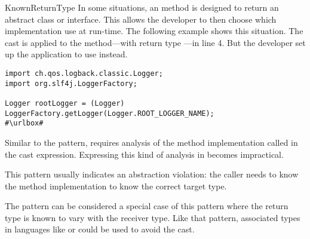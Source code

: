 \begin{pattern}{KnownReturnType}
In some situations,
an \api{} method is designed to return an abstract class or interface.
This \api{} allows the developer to then choose which implementation use at run-time.
The following example shows this situation.
The cast is applied to the  method---with return type ---in line 4.
But the developer set up the application to use  instead.

\def\urlvar{http://bit.ly/skylot_jadx_2HIoR9X}
\begin{verbatim}
import ch.qos.logback.classic.Logger;
import org.slf4j.LoggerFactory;

Logger rootLogger = (Logger) LoggerFactory.getLogger(Logger.ROOT_LOGGER_NAME);
#\urlbox#
\end{verbatim}


\detection{}
Similar to the  pattern,
\thisp{} requires analysis of the method implementation called in the cast expression.
Expressing this kind of analysis in \ql{} becomes impractical.


\issues{}
This pattern usually indicates an abstraction violation:
the caller needs to know the method implementation to know the correct target type.

The  pattern can be considered a special case of this pattern where the return type is known to vary with the receiver type.
Like that pattern,
associated types~\citep{chakravartyAssociatedTypeSynonyms2005}
in languages like \haskell{} or \rust{} could be used to avoid the cast.

\end{pattern}